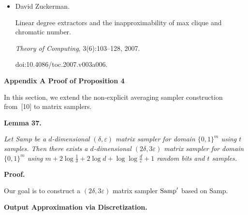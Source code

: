 \begin{itemize}
\item[] 
[44]

David Zuckerman.


Linear degree extractors and the inapproximability of max clique and
chromatic number.


\emph{Theory of Computing}, 3(6):103–128, 2007.


doi:10.4086/toc.2007.v003a006.





\end{itemize}




\par\medskip\noindent\textbf{
Appendix A Proof of Proposition 4
}\par




In this section, we extend the non-explicit averaging sampler construction from [10] to matrix samplers.\par





\par\medskip\noindent\textbf{
\textbf{Lemma 37}\textbf{.}
}\par



\emph{Let Samp be a $d$-dimensional $(\delta,\varepsilon)$ matrix sampler for domain $\{0,1\}^{m}$ using $t$ samples. Then there exists a $d$-dimensional $(2\delta,3\varepsilon)$ matrix sampler for domain $\{0,1\}^{m}$ using $m+2\log\frac{1}{\delta}+2\log d+\log\log\frac{d}{\varepsilon}+1$ random bits and $t$ samples.}\par






\par\medskip\noindent\textbf{Proof.}\par




Our goal is to construct a $(2\delta,3\varepsilon)$ matrix sampler $\textup{{Samp}}^{\prime}$ based on Samp.\par





\par\medskip\noindent\textbf{Output Approximation via Discretization.}\par




